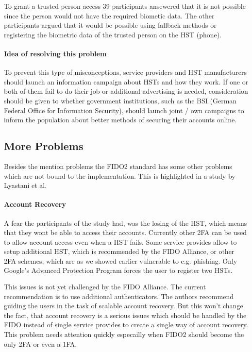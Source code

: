 \documentclass[runningheads]{llncs}
\begin{document}
To grant a trusted person access 39 participants ansewered that it is not possible since the person would not have the required biometic data. The other participants argued that it would be possible using fallback methods or registering the biometric data of the trusted person on the HST (phone).

\paragraph{Idea of resolving this problem}
To prevent this type of misconceptions, service providers and HST manufacturers should launch an information campaign about HSTs and how they work. 
If one or both of them fail to do their job or additional advertising is needed, consideration should be given to whether government institutions, such as the BSI (German Federal Office for Information Security), should launch joint / own campaigns to inform the population about better methods of securing their accounts online.

\subsection{More Problems}
Besides the mention problems the FIDO2 standard has some other problems which are not bound to the implementation. This is highlighted in a study by Lyastani et al. \cite{9152694}

\paragraph{Account Recovery}
A fear the participants of the study had, was the losing of the HST, which means that they wont be able to access their accounts. Currently other 2FA can be used to allow account access even when a HST fails. Some service provides allow to setup additional HST, which is recommended by the FIDO Alliance, or other 2FA schemes, which are as we showed earlier vulnerable to e.g. phishing. Only Google's Advanced Protection Program forces the user to register two HSTs.

This issues is not yet challenged by the FIDO Alliance. The current recommendation is to use additional authenticators. The authors recommend guiding the users in the task of scalable account recovery. But this won't change the fact, that account recovery is a serious issues which should be handled by the FIDO instead of single service provides to create a single way of account recovery. This problem needs attention quickly especailly when FIDO2 should become the only 2FA or even a 1FA. 
\end{document}
